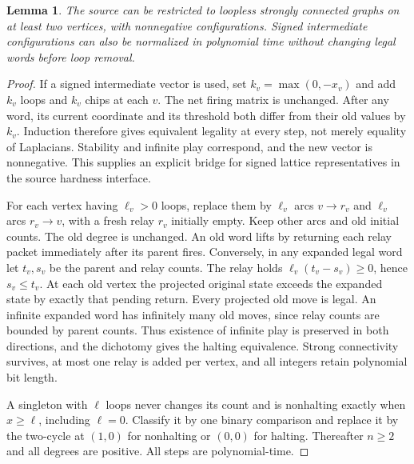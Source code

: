 \documentclass[11pt]{article}
\newtheorem{lemma}[theorem]{Lemma}
\begin{document}
\begin{lemma}\label{lem:preprocess}
The source can be restricted to loopless strongly connected graphs on
at least two vertices, with nonnegative configurations. Signed
intermediate configurations can also be normalized in polynomial time
without changing legal words before loop removal.
\end{lemma}
\begin{proof}
If a signed intermediate vector is used, set $k_v=\max(0,-x_v)$ and
add $k_v$ loops and $k_v$ chips at each $v$. The net firing matrix is
unchanged. After any word, its current coordinate and its threshold
both differ from their old values by $k_v$. Induction therefore gives
equivalent legality at every step, not merely equality of Laplacians.
Stability and infinite play correspond, and the new vector is
nonnegative. This supplies an explicit bridge for signed lattice
representatives in the source hardness interface.

For each vertex having $\ell_v>0$ loops, replace them by $\ell_v$ arcs
$v\to r_v$ and $\ell_v$ arcs $r_v\to v$, with a fresh relay $r_v$
initially empty. Keep other arcs and old initial counts. The old degree
is unchanged. An old word lifts by returning each relay packet
immediately after its parent fires. Conversely, in any expanded legal
word let $t_v,s_v$ be the parent and relay counts. The relay holds
$\ell_v(t_v-s_v)\geq0$, hence $s_v\leq t_v$. At each old vertex the
projected original state exceeds the expanded state by exactly that
pending return. Every projected old move is legal. An infinite
expanded word has infinitely many old moves, since relay counts are
bounded by parent counts. Thus existence of infinite play is preserved
in both directions, and the dichotomy gives the halting equivalence.
Strong connectivity survives, at most one relay is added per vertex,
and all integers retain polynomial bit length.

A singleton with $\ell$ loops never changes its count and is
nonhalting exactly when $x\geq\ell$, including $\ell=0$. Classify it
by one binary comparison and replace it by the two-cycle at $(1,0)$
for nonhalting or $(0,0)$ for halting. Thereafter $n\geq2$ and all
degrees are positive. All steps are polynomial-time.
\end{proof}
\end{document}

